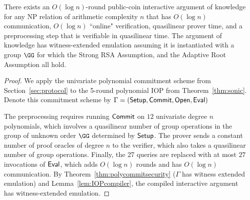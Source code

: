 \begin{theorem}
There exists an $O(\log n)$-round public-coin interactive argument of knowledge for any NP relation of arithmetic complexity $n$ that has $O(\log n)$ communication, $O(\log n)$ ``online" verification, quasilinear prover time, and a preprocessing step that is verifiable in quasilinear time. The argument of knowledge has witness-extended emulation assuming it is instantiated with a group $\GG$ for which the Strong RSA Assumption, and the Adaptive Root Assumption all hold. 
\end{theorem}
\begin{proof}
We apply the univariate polynomial commitment scheme from Section~\ref{sec:protocol} to the 5-round polynomial IOP from Theorem~\ref{thm:sonic}. Denote this commitment scheme by $\Gamma = (\textsf{{Setup}}, \textsf{{Commit}}, \textsf{{Open}}, \textsf{{Eval}})$ 

The preprocessing requires running $\textsf{{Commit}}$ on $12$ univariate degree $n$ polynomials, which involves a quasilinear number of group operations in the group of unknown order $\GG$ determined by $\textsf{{Setup}}$. The prover sends a constant number of proof oracles of degree $n$ to the verifier, which also takes a quasilinear number of group operations. Finally, the 27 queries are replaced with at most $27$ invocations of $\textsf{{Eval}}$, which adds $O(\log n )$ rounds and has $O(\log n)$ communication. By Theorem~\ref{thm:polycommitsecurity} ($\Gamma$ has witness extended emulation) and Lemma~\ref{lem:IOPcompiler}, the compiled interactive argument has witness-extended emulation.

\end{proof}

